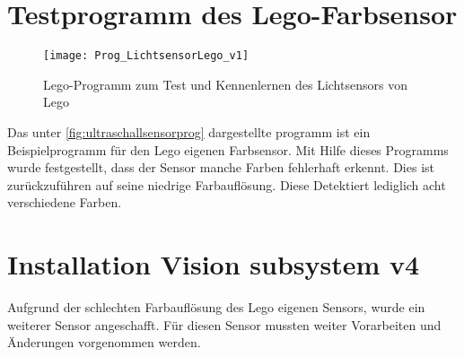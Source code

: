 \section{Testprogramm des Lego-Farbsensor}
\begin{figure}[htb]
\centering
\texttt{[image: Prog\_LichtsensorLego\_v1]}
\caption{Lego-Programm zum Test und Kennenlernen des Lichtsensors von Lego}
\label{fig:ultraschallsensorprog}
\end{figure}
Das unter \vref{fig:ultraschallsensorprog} dargestellte programm ist ein Beispielprogramm für den Lego eigenen Farbsensor. 
Mit Hilfe dieses Programms wurde festgestellt, dass der Sensor manche Farben fehlerhaft erkennt. Dies ist zurückzuführen auf seine niedrige Farbauflösung. Diese Detektiert lediglich acht verschiedene Farben.
\section{Installation Vision subsystem v4}
Aufgrund der schlechten Farbauflösung des Lego eigenen Sensors, wurde ein weiterer Sensor angeschafft. Für diesen Sensor mussten weiter Vorarbeiten und Änderungen vorgenommen werden.


